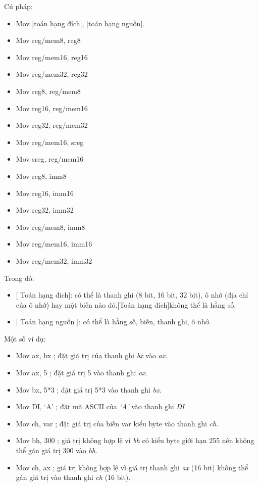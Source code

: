 		Cú pháp: 
		\begin{itemize}
			\renewcommand{\labelitemi}{\textbullet}	
			\item Mov [toán hạng đích], [toán hạng nguồn].
			\item	Mov reg/mem8, reg8
			\item Mov reg/mem16, reg16
			\item	Mov reg/mem32, reg32
			\item	Mov reg8, reg/mem8
			\item	Mov reg16, reg/mem16
			\item	Mov reg32, reg/mem32
			\item	Mov reg/mem16, sreg
			\item	Mov sreg, reg/mem16
			\item	Mov reg8, imm8
			\item	Mov reg16, imm16
			\item	Mov reg32, imm32
			\item	Mov reg/mem8, imm8
			\item	Mov reg/mem16, imm16
			\item	Mov reg/mem32, imm32	
		\end{itemize}
	
	Trong đó: 
	\begin{itemize}
		\renewcommand{\labelitemi}{\textbullet}	
			\item  $[$ Toán hạng đich$]$: có thể là thanh ghi (8 bit, 16 bit, 32 bit), ô nhớ (địa chỉ của ô nhớ) hay một biến nào đó.$[$Toán hạng đích$]$không thể là hằng số.
			\item $[$ Toán hạng nguồn $]$: có thể là hằng số, biến, thanh ghi, ô nhớ.
	\end{itemize}

	\newpage
	Một số ví dụ:
		\begin{itemize}
		\renewcommand{\labelitemi}{\textbullet}	
		\item	Mov ax, bx 		; đặt giá trị của thanh ghi \textit{bx} vào \textit{ax}.
		\item Mov ax, 5		; đặt giá trị 5 vào thanh ghi \textit{ax}.
		\item	Mov bx, 5*3 		; đặt giá trị 5*3 vào thanh ghi \textit{bx}.
		\item Mov DI, ‘A’		; đặt mã ASCII của\textit{ ‘A’} vào thanh ghi \textit{DI}
		\item Mov ch, var		; đặt giá trị của biến var kiểu byte vào thanh ghi \textit{ch}.
		\item	Mov bh, 300		; giá trị không hợp lệ vì \textit{bh} có kiểu byte giới hạn 255 nên không thể gán giá trị 300 vào\textit{ bh}.
		\item	Mov ch, ax		; giá trị không hợp lệ vì giá trị thanh ghi \textit{ax} (16 bit) không thể gán giá trị vào thanh ghi \textit{ch} (16 bit).  
		\end{itemize}

